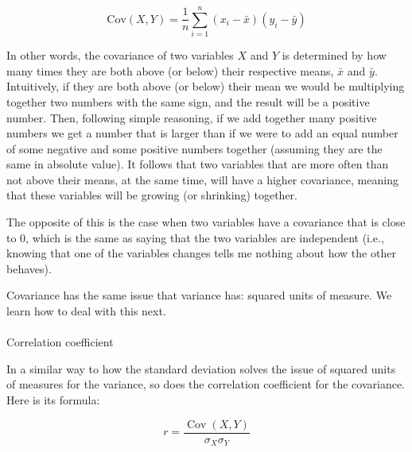 \documentclass[
  letterpaper,
  DIV=11,
  numbers=noendperiod]{scrartcl}
\makeatletter
\let\oldparagraph\paragraph
\renewcommand{\paragraph}{
    \@ifstar
      \xxxParagraphStar
      \xxxParagraphNoStar
  }
\newcommand{\xxxParagraphStar}[1]{\oldparagraph*{#1}\mbox{}}
\newcommand{\xxxParagraphNoStar}[1]{\oldparagraph{#1}\mbox{}}
\makeatother
\begin{document}
\[
\text{Cov}(X, Y) = \frac{1}{n} \sum_{i=1}^{n} (x_i - \bar{x})(y_i - \bar{y})
\]

In other words, the covariance of two variables \(X\) and \(Y\) is
determined by how many times they are both above (or below) their
respective means, \(\bar{x}\) and \(\bar{y}\). Intuitively, if they are
both above (or below) their mean we would be multiplying together two
numbers with the same sign, and the result will be a positive number.
Then, following simple reasoning, if we add together many positive
numbers we get a number that is larger than if we were to add an equal
number of some negative and some positive numbers together (assuming
they are the same in absolute value). It follows that two variables that
are more often than not above their means, at the same time, will have a
higher covariance, meaning that these variables will be growing (or
shrinking) together.

The opposite of this is the case when two variables have a covariance
that is close to 0, which is the same as saying that the two variables
are independent (i.e., knowing that one of the variables changes tells
me nothing about how the other behaves).

\begin{tcolorbox}[enhanced jigsaw, colframe=quarto-callout-caution-color-frame, toptitle=1mm, colbacktitle=quarto-callout-caution-color!10!white, opacitybacktitle=0.6, bottomtitle=1mm, opacityback=0, left=2mm, coltitle=black, breakable, titlerule=0mm, title=\textcolor{quarto-callout-caution-color}{\faFire}\hspace{0.5em}{Caution}, colback=white, arc=.35mm, rightrule=.15mm, bottomrule=.15mm, leftrule=.75mm, toprule=.15mm]

Covariance has the same issue that variance has: squared units of
measure. We learn how to deal with this next.

\end{tcolorbox}

\paragraph{Correlation coefficient}\label{correlation-coefficient}

In a similar way to how the standard deviation solves the issue of
squared units of measures for the variance, so does the correlation
coefficient for the covariance. Here is its formula:

\[
r = \frac{\operatorname{Cov}(X, Y)}{\sigma_X \sigma_Y}
\]
\end{document}
